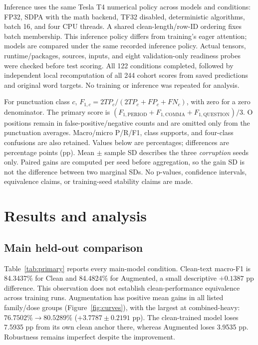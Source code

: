 \documentclass{article}
\begin{document}
Inference uses the same Tesla T4 numerical policy across models and conditions:
FP32, SDPA with the math backend, TF32 disabled, deterministic algorithms, batch
16, and four CPU threads. A shared clean-length/row-ID ordering fixes batch
membership. This inference policy differs from training's eager attention;
models are compared under the same recorded inference policy. Actual tensors,
runtime/packages, sources, inputs, and eight validation-only readiness probes
were checked before test scoring. All 122 conditions completed, followed by
independent local recomputation of all 244 cohort scores from saved predictions
and original word targets. No training or inference was repeated for analysis.

For punctuation class $c$, $F_{1,c}=2TP_c/(2TP_c+FP_c+FN_c)$, with zero for a
zero denominator. The primary score is
$(F_{1,\mathrm{PERIOD}}+F_{1,\mathrm{COMMA}}+F_{1,\mathrm{QUESTION}})/3$.
O positions remain in false-positive/negative counts and are omitted only from
the punctuation averages. Macro/micro P/R/F1, class supports, and four-class
confusions are also retained. Values below are percentages; differences are
percentage points (pp). Mean $\pm$ sample SD describes the three \emph{corruption}
seeds only. Paired gains are computed per seed before aggregation, so the gain
SD is not the difference between two marginal SDs. No p-values, confidence
intervals, equivalence claims, or training-seed stability claims are made.

\section{Results and analysis}
\subsection{Main held-out comparison}
\begin{table}[t]
\centering\small
\caption{Complete primary held-out matrix, punctuation macro-F1 (\%). Stochastic
conditions are means $\pm$ sample SD over three corruption seeds. Clean and full
endpoints are deterministic. $\Delta$ is the paired Augmented minus Clean gain
in pp. Ablation values are reported separately in Table~\ref{tab:ablation}.}
\label{tab:primary}
\PrimaryResults
\end{table}

Table~\ref{tab:primary} reports every main-model condition. Clean-text macro-F1
is 84.3437\% for Clean and 84.4824\% for Augmented, a small descriptive
$+0.1387$ pp difference. This observation does not establish clean-performance
equivalence across training runs. Augmentation has positive mean gains in all
listed family/dose groups (Figure~\ref{fig:curves}), with the largest at combined-heavy:
$76.7502\%\rightarrow80.5289\%$ ($+3.7787\pm0.2191$ pp).
The clean-trained model loses 7.5935 pp from its own clean anchor there, whereas
Augmented loses 3.9535 pp. Robustness remains imperfect despite the improvement.
\end{document}
